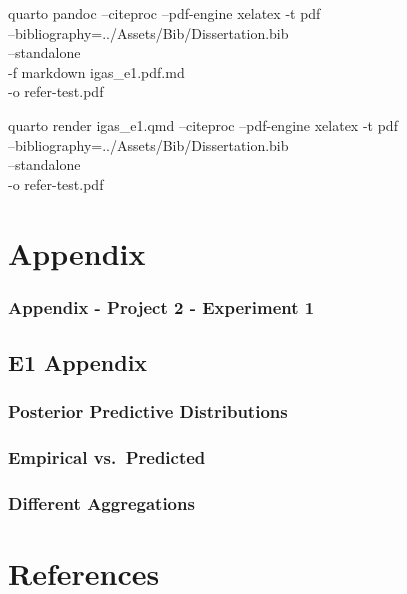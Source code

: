 \documentclass[
  letterpaper,
  DIV=11,
  numbers=noendperiod]{scrartcl}
\begin{document}
quarto pandoc --citeproc --pdf-engine xelatex -t pdf\\
--bibliography=../Assets/Bib/Dissertation.bib\\
--standalone\\
-f markdown igas\_e1.pdf.md\\
-o refer-test.pdf

quarto render igas\_e1.qmd --citeproc --pdf-engine xelatex -t pdf\\
--bibliography=../Assets/Bib/Dissertation.bib\\
--standalone\\
-o refer-test.pdf

\section{Appendix}\label{appendix}

\subsubsection{Appendix - Project 2 - Experiment
1}\label{appendix---project-2---experiment-1}

\subsection{E1 Appendix}\label{e1-appendix}

\subsubsection{Posterior Predictive
Distributions}\label{posterior-predictive-distributions}

\subsubsection{Empirical vs.~Predicted}\label{empirical-vs.-predicted}

\subsubsection{Different Aggregations}\label{different-aggregations}

\section*{References}\label{references}
\end{document}
